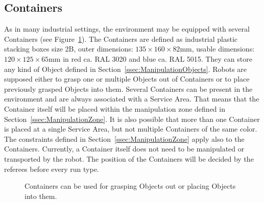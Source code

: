 \subsection{Containers}
As in many industrial settings, the \RCAW environment may be equipped with several Containers (see Figure~\ref{fig:containers}). The Containers are defined as industrial plastic stacking boxes size 2B, outer dimensions: $135 \times 160 \times 82  \si{\milli\meter}$, usable dimensions: $120 \times 125 \times 65  \si{\milli\meter}$  in red ca. RAL 3020 and blue ca. RAL 5015.
They can store any kind of Object defined in Section~\ref{ssec:ManipulationObjects}. Robots are supposed either to grasp one or multiple Objects out of Containers or to place previously grasped Objects into them. Several Containers can be present in the environment and are always associated with a Service Area. That means that the Container itself will be placed within the manipulation zone defined in Section~\ref{ssec:ManipulationZone}.
It is also possible that more than one Container is placed at a single Service Area, but not multiple Containers of the same color.
The constraints defined in Section~\ref{ssec:ManipulationZone} apply also to the Containers.
Currently, a Container itself does not need to be manipulated or transported by the robot. The position of the Containers will be decided by the referees before every run type.

\begin{figure} [h!]
	\begin{center}
		\hspace{0.05\textwidth}
	\end{center}
	\caption{Containers can be used for grasping Objects out or placing Objects into them.}
	\label{fig:containers}
\end{figure}




